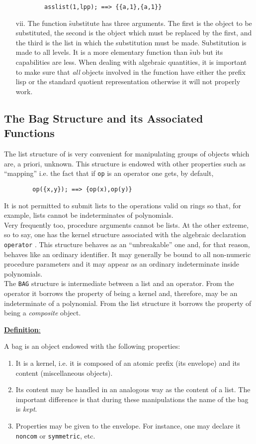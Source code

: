 \begin{itemize}
\begin{verbatim}
        asslist(1,lpp); ==> {{a,1},{a,1}}
\end{verbatim}
\item[vii.]
\hypertarget{operator:SUBSTITUTE}{}
The function \f{substitute} has three arguments. The first
is the object to be substituted, the second is the object which must be
replaced by the first, and the third is the list in which the substitution 
must be made. Substitution is made to
all levels. It is a more elementary function than \f{sub} but its
capabilities are less. When dealing with algebraic quantities, it is
important to make sure that \emph{all} objects involved in the function
have either the prefix lisp or the standard quotient representation
otherwise it will not properly work.
\end{itemize}
\subsection{ The Bag Structure and its Associated Functions}
The list structure of \REDUCE is very convenient for manipulating
groups of objects which are, a priori, unknown. This structure is
endowed with other properties such as ``mapping'' i.e. the fact that
if \texttt{op} is an operator one gets, by default,
\begin{verbatim}
        op({x,y}); ==> {op(x),op(y)}
\end{verbatim}
It is not permitted to submit lists to the operations valid on rings
so that, for example, lists cannot be indeterminates of polynomials.\\
Very frequently too, procedure arguments cannot be lists.
At the other extreme, so to say, one has the kernel
structure associated
with the algebraic declaration \texttt{operator} .  This structure behaves as
an ``unbreakable'' one and, for that reason, behaves
like an ordinary identifier.
It may generally be bound to all non-numeric procedure parameters
and it may appear
as an ordinary indeterminate inside polynomials. \\
The \texttt{BAG} structure is intermediate between a list and an operator.
From the operator it borrows the property of being a kernel and,
therefore, may be an indeterminate of a polynomial. From the list structure
it borrows the property of being a \emph{composite} object.

\underline{\textbf{Definition}:}

A bag is an object endowed with the following properties:
\begin{enumerate}
\item It is a kernel, i.e. it is composed of an atomic prefix (its
envelope) and
its content (miscellaneous objects).
\item Its content may be handled in an analogous way as the content of a
list. The important difference is that during these manipulations 
the name of the bag is \emph{kept}.
\item Properties may be given to the envelope. For instance, one may
declare it \texttt{noncom} or \texttt{symmetric}, etc.
\end{enumerate}

